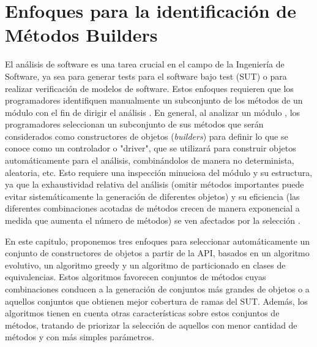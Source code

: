 \chapter[Identificación de métodos builders]{Enfoques para la identificación de Métodos Builders}
\label{cap:builders}


El análisis de software es una tarea crucial en el campo de la Ingeniería de
Software, ya sea para generar tests para el software bajo test (SUT) o para
realizar verificación de modelos de software. Estos enfoques  requieren que los
programadores identifiquen manualmente un subconjunto de los métodos de un
módulo con el fin de dirigir el análisis . En general, al analizar un módulo
,
los programadores seleccionan un subconjunto de sus métodos que serán
considerados como constructores de objetos (\emph{builders}) para definir lo que
se conoce como un controlador o "driver", que se utilizará para construir
objetos automáticamente para el análisis, combinándolos de manera no
determinista, aleatoria, etc. Esto requiere una inspección minuciosa del módulo
y su estructura, ya que la exhaustividad relativa del análisis (omitir métodos
importantes puede evitar sistemáticamente la generación de diferentes objetos) y
su eficiencia (las diferentes combinaciones acotadas de métodos crecen de manera
exponencial a medida que aumenta el número de métodos) se ven afectados por la
selección .

En este capitulo, proponemos tres enfoques para seleccionar automáticamente un
conjunto de constructores de objetos a partir de la API, basados en un algoritmo
evolutivo, un algoritmo greedy y un algoritmo de particionado en clases de equivalencias. Estos algoritmos favorecen conjuntos de métodos cuyas combinaciones conducen a la generación de conjuntos más grandes de objetos o a aquellos conjuntos que obtienen mejor cobertura de ramas del SUT. Además, los algoritmos tienen en cuenta otras características sobre estos conjuntos de métodos, tratando de priorizar la selección de aquellos con menor cantidad de métodos y con más simples parámetros.

